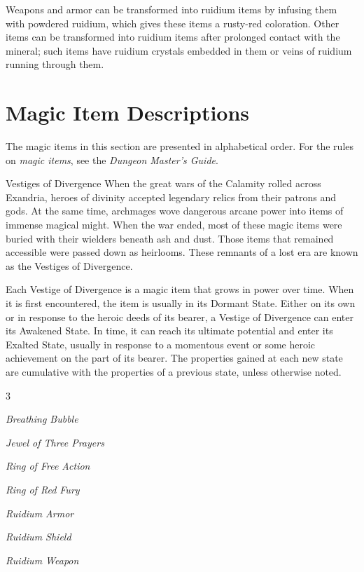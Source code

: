\documentclass[10pt,a4paper,twoside,bg=print,twocolumn,openany,nodeprecatedcode]{dndbook}
\begin{document}
Weapons and armor can be transformed into ruidium items by infusing them with powdered ruidium, which gives these items a rusty-red coloration. Other items can be transformed into ruidium items after prolonged contact with the mineral; such items have ruidium crystals embedded in them or veins of ruidium running through them.

\section{Magic Item Descriptions}
The magic items in this section are presented in alphabetical order. For the rules on \textit{magic items}, see the \textit{Dungeon Master's Guide}.

\begin{DndSidebar}[float=!b]{Vestiges of Divergence}
When the great wars of the Calamity rolled across Exandria, heroes of divinity accepted legendary relics from their patrons and gods. At the same time, archmages wove dangerous arcane power into items of immense magical might. When the war ended, most of these magic items were buried with their wielders beneath ash and dust. Those items that remained accessible were passed down as heirlooms. These remnants of a lost era are known as the Vestiges of Divergence.



Each Vestige of Divergence is a magic item that grows in power over time. When it is first encountered, the item is usually in its Dormant State. Either on its own or in response to the heroic deeds of its bearer, a Vestige of Divergence can enter its Awakened State. In time, it can reach its ultimate potential and enter its Exalted State, usually in response to a momentous event or some heroic achievement on the part of its bearer. The properties gained at each new state are cumulative with the properties of a previous state, unless otherwise noted.



\end{DndSidebar}


\begin{itemize}
\begin{multicols}{3}
\item \textit{Breathing Bubble}
\item \textit{Jewel of Three Prayers}
\item \textit{Ring of Free Action}
\item \textit{Ring of Red Fury}
\item \textit{Ruidium Armor}
\item \textit{Ruidium Shield}
\item \textit{Ruidium Weapon}
\end{multicols}

\end{itemize}
\end{document}

